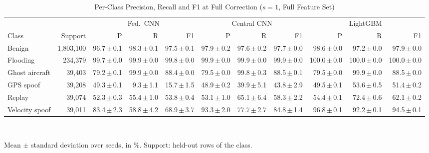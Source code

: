 \begin{table}[t]
\centering
\scriptsize
\caption{Per-Class Precision, Recall and F1 at Full Correction ($s=1$, Full Feature Set)}
\label{tab:perclass}
\setlength{\tabcolsep}{2pt}
\begin{tabular}{lrrrrrrrrrr}
\toprule
& & \multicolumn{3}{c}{Fed.\ CNN} & \multicolumn{3}{c}{Central CNN} & \multicolumn{3}{c}{LightGBM} \\
\cmidrule(lr){3-5}\cmidrule(lr){6-8}\cmidrule(lr){9-11}
Class & Support & P & R & F1 & P & R & F1 & P & R & F1 \\
\midrule
Benign & 1{,}803{,}100 & 96.7{\,}$\pm${\,}0.1 & 98.3{\,}$\pm${\,}0.1 & 97.5{\,}$\pm${\,}0.1 & 97.9{\,}$\pm${\,}0.2 & 97.6{\,}$\pm${\,}0.2 & 97.7{\,}$\pm${\,}0.0 & 98.6{\,}$\pm${\,}0.0 & 97.2{\,}$\pm${\,}0.0 & 97.9{\,}$\pm${\,}0.0 \\
Flooding & 234{,}379 & 99.7{\,}$\pm${\,}0.0 & 99.9{\,}$\pm${\,}0.0 & 99.8{\,}$\pm${\,}0.0 & 99.9{\,}$\pm${\,}0.0 & 99.9{\,}$\pm${\,}0.0 & 99.9{\,}$\pm${\,}0.0 & 100.0{\,}$\pm${\,}0.0 & 100.0{\,}$\pm${\,}0.0 & 100.0{\,}$\pm${\,}0.0 \\
Ghost aircraft & 39{,}403 & 79.2{\,}$\pm${\,}0.1 & 99.9{\,}$\pm${\,}0.0 & 88.4{\,}$\pm${\,}0.0 & 79.5{\,}$\pm${\,}0.0 & 99.8{\,}$\pm${\,}0.3 & 88.5{\,}$\pm${\,}0.1 & 79.5{\,}$\pm${\,}0.0 & 99.9{\,}$\pm${\,}0.0 & 88.5{\,}$\pm${\,}0.0 \\
GPS spoof & 39{,}208 & 49.3{\,}$\pm${\,}0.1 & 9.3{\,}$\pm${\,}1.1 & 15.7{\,}$\pm${\,}1.5 & 48.9{\,}$\pm${\,}0.2 & 39.9{\,}$\pm${\,}5.1 & 43.8{\,}$\pm${\,}2.9 & 49.5{\,}$\pm${\,}0.1 & 53.6{\,}$\pm${\,}0.5 & 51.4{\,}$\pm${\,}0.2 \\
Replay & 39{,}074 & 52.3{\,}$\pm${\,}0.3 & 55.4{\,}$\pm${\,}1.0 & 53.8{\,}$\pm${\,}0.4 & 53.1{\,}$\pm${\,}1.0 & 65.1{\,}$\pm${\,}6.4 & 58.3{\,}$\pm${\,}2.2 & 54.4{\,}$\pm${\,}0.1 & 72.4{\,}$\pm${\,}0.6 & 62.1{\,}$\pm${\,}0.2 \\
Velocity spoof & 39{,}011 & 83.4{\,}$\pm${\,}2.3 & 58.8{\,}$\pm${\,}4.2 & 68.9{\,}$\pm${\,}3.7 & 93.3{\,}$\pm${\,}2.0 & 77.7{\,}$\pm${\,}2.7 & 84.8{\,}$\pm${\,}1.4 & 96.8{\,}$\pm${\,}0.1 & 92.2{\,}$\pm${\,}0.1 & 94.5{\,}$\pm${\,}0.1 \\
\bottomrule
\end{tabular}
\\[2pt]
\parbox{\linewidth}{\scriptsize Mean $\pm$ standard deviation over  seeds, in \%. Support: held-out rows of the class.}
\end{table}
